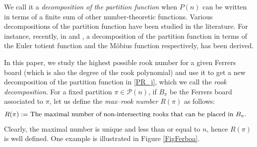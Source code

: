 \documentclass[12pt,reqno]{amsart}
\numberwithin{equation}{section}
\theoremstyle{plain}
\begin{document}
	We call it a \textit{decomposition of the partition function} when $P(n)$ can be written in terms of a finite sum of other number-theoretic functions. Various decompositions of the partition function have been studied in the literature. For instance, recently, in \cite{merca1} and \cite{merca2}, a decomposition of the partition function in terms of the Euler totient function and the M{\"o}bius function respectively, has been derived.
	
	In this paper, we study the highest possible rook number for a given Ferrers board (which is also the degree of the rook polynomial) and use it to get a new decomposition of the partition function in \eqref{PR_j}, which we call the \textit{rook decomposition}. For a fixed partition $\pi \in \mathscr{P}(n)$, if $B_{\pi}$ be the Ferrers board associated to $\pi$, let us define the \emph{max--rook number} $R(\pi)$ as follows:
	\begin{align*}
		R(\pi):=&\textup{ The maximal number of non-intersecting rooks that can be placed in } B_\pi.
	\end{align*}
	Clearly, the maximal number is unique and less than or equal to $n$, hence $R(\pi)$ is well defined. One example is illustrated in Figure \ref{FigFerboa}. 
\end{document}
